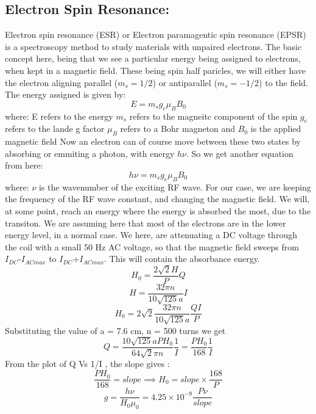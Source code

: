 \begin{Abstract:}
\begin{Abstract:}
\subsection{Electron Spin Resonance:}
	Electron spin resonance (ESR) or Electron paramagentic spin resonance (EPSR) is a spectroscopy method to study materials with unpaired electrons. The basic concept here, being that we see a particular energy being assigned to electrons, when kept in a magnetic field. These being spin half paricles, we will either have the electron aligning parallel ($m_s = 1/2$) or antiparallel ($m_s = -1/2$) to the field. The energy assigned is given by:
	\begin{equation}
		E = m_s g_e \mu_B B_0
	\end{equation}
	where:
	\newline E refers to the energy
	\newline $m_s$ refers to the magneitc component of the spin
	\newline $g_e$ refers to the lande g factor
	\newline $\mu_B$ refers to a Bohr magneton
	\newline and $B_0$ is the applied magnetic field
	Now an electron can of course move between these two states by absorbing or emmiting a photon, with energy $h\nu$. So we get another equation from here:
	\begin{equation}
		h\nu=m_s g_e \mu_B B_0
	\end{equation}
	where:
	\newline $\nu$ is the wavenumber of the exciting RF wave.
	For our case, we are keeping the frequency of the RF wave constant, and changing the magnetic field. We will, at some point, reach an energy where the energy is absorbed the most, due to the transiton. We are assuming here that most of the electrons are in the lower energy level, in a normal case.
	We here, are attenuating a DC voltage through the coil with a small 50 Hz AC voltage, so that the magnetic field sweeps from $I_{DC}$-$I_{AC max}$ to $I_{DC}$+$I_{AC max}$. This will contain the absorbance energy.
	\begin{equation}
	H_0 = \frac{2\sqrt{2}H}{P}Q
	\end{equation}
	\begin{equation}\label{key}
	H=\frac{32\pi n}{10\sqrt{125}a}I
	\end{equation}
	\begin{equation}\label{key}
	H_0=2\sqrt{2}\frac{32\pi n}{10\sqrt{125}a}\frac{QI}{P}
	\end{equation}
	Substituting the value of a = 7.6 cm, n = 500 turns we get
	\begin{equation}\label{key}
	Q=\frac{10\sqrt{125}a PH_0}{64\sqrt{2}\pi n }\frac{1}{I}=\frac{PH_0}{168}\frac{1}{I} 
	\end{equation}
	From the plot of Q Vs 1/I , the slope gives : 
	\begin{equation}\label{key}
	 \frac{PH_0}{168}=slope \implies H_0=slope \times \frac{168}{P}
	\end{equation}
	\begin{equation}\label{eq}
	g=\frac{h \nu}{H_0 \mu_0} = 4.25\times10^{-9} \frac{P \nu}{slope}
	\end{equation}

\end{Abstract:}
\end{Abstract:}
